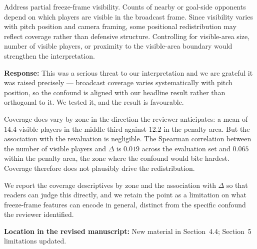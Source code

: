 \documentclass[11pt,a4paper]{article}
\newcommand{\response}[2]{%
  \begin{responsebox}
  \textbf{Response:}
  #1
  \end{responsebox}
  \begin{locationbox}
  \textbf{Location in the revised manuscript:}
  #2
  \end{locationbox}
}
\begin{document}
\begin{reviewbox}
Address partial freeze-frame visibility. Counts of nearby or goal-side opponents depend on which players are visible in the broadcast frame. Since visibility varies with pitch position and camera framing, some positional redistribution may reflect coverage rather than defensive structure. Controlling for visible-area size, number of visible players, or proximity to the visible-area boundary would strengthen the interpretation.
\end{reviewbox}
\response{This was a serious threat to our interpretation and we are grateful it was raised precisely --- broadcast coverage varies systematically with pitch position, so the confound is aligned with our headline result rather than orthogonal to it. We tested it, and the result is favourable.

Coverage does vary by zone in the direction the reviewer anticipates: a mean of 14.4 visible players in the middle third against 12.2 in the penalty area. But the association with the revaluation is negligible. The Spearman correlation between the number of visible players and $\Delta$ is $0.019$ across the evaluation set and $0.065$ within the penalty area, the zone where the confound would bite hardest. Coverage therefore does not plausibly drive the redistribution.

We report the coverage descriptives by zone and the association with $\Delta$ so that readers can judge this directly, and we retain the point as a limitation on what freeze-frame features can encode in general, distinct from the specific confound the reviewer identified.}{New material in Section~4.4; Section~5 limitations updated.}
\end{document}
